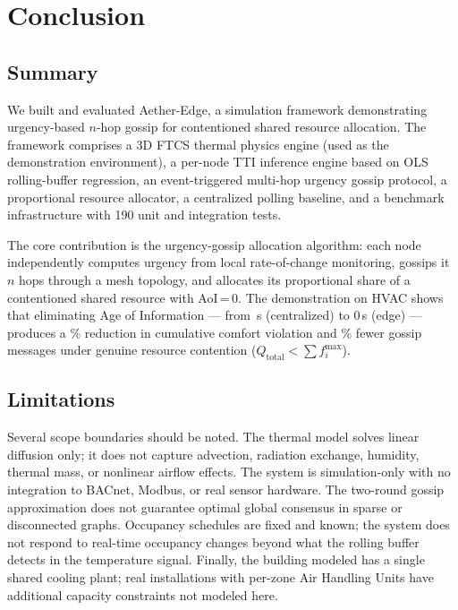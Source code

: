 \documentclass[conference]{IEEEtran}
\begin{document}
\section{Conclusion}

\subsection{Summary}

We built and evaluated Aether-Edge, a simulation framework demonstrating
urgency-based $n$-hop gossip for contentioned shared resource allocation.
The framework comprises a 3D FTCS thermal physics engine (used as the
demonstration environment), a per-node TTI inference engine based on OLS
rolling-buffer regression, an event-triggered multi-hop urgency gossip
protocol, a proportional resource allocator, a centralized polling baseline,
and a benchmark infrastructure with 190 unit and integration tests.

The core contribution is the urgency-gossip allocation algorithm: each node
independently computes urgency from local rate-of-change monitoring, gossips
it $n$ hops through a mesh topology, and allocates its proportional share of
a contentioned shared resource with AoI\,=\,0.  The demonstration on HVAC
shows that eliminating Age of Information --- from \,s (centralized)
to 0\,s (edge) --- produces a \% reduction in cumulative comfort
violation and \% fewer gossip messages under genuine resource
contention ($Q_{\text{total}} < \sum f_i^{\max}$).  

\subsection{Limitations}

Several scope boundaries should be noted.  The thermal model solves linear
diffusion only; it does not capture advection, radiation exchange, humidity,
thermal mass, or nonlinear airflow effects.  The system is
simulation-only with no integration to BACnet, Modbus, or real sensor
hardware.  The two-round gossip approximation does not guarantee optimal
global consensus in sparse or disconnected graphs.  Occupancy schedules are
fixed and known; the system does not respond to real-time occupancy changes
beyond what the rolling buffer detects in the temperature signal.  Finally,
the building modeled has a single shared cooling plant; real installations
with per-zone Air Handling Units have additional capacity constraints not
modeled here.
\end{document}
